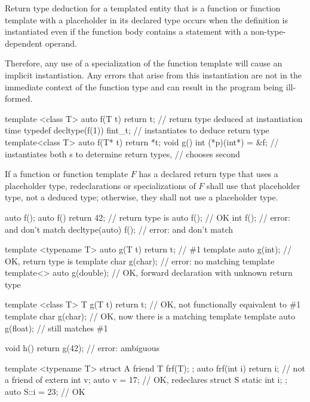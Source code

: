 \pnum
Return type deduction for a templated entity
that is a function or function template with a placeholder in its
declared type occurs when the definition is instantiated even if the function
body contains a  statement with a non-type-dependent operand.
\begin{note}
Therefore, any use of a specialization of the function template will
cause an implicit instantiation. Any errors that arise from this instantiation
are not in the immediate context of the function type and can result in the
program being ill-formed.
\end{note}
\begin{example}
\begin{codeblock}
template <class T> auto f(T t) { return t; }    // return type deduced at instantiation time
typedef decltype(f(1)) fint_t;                  // instantiates  to deduce return type
template<class T> auto f(T* t) { return *t; }
void g() { int (*p)(int*) = &f; }               // instantiates both s to determine return types,
                                                // chooses second
\end{codeblock}
\end{example}

\pnum
If a function or function template $F$ has
a declared return type that uses a placeholder type,
redeclarations or specializations of $F$ shall use that
placeholder type, not a deduced type;
otherwise, they shall not use a placeholder type.
\begin{example}
\begin{codeblock}
auto f();
auto f() { return 42; }                         // return type is 
auto f();                                       // OK
int f();                                        // error:  and  don't match
decltype(auto) f();                             // error:  and  don't match

template <typename T> auto g(T t) { return t; } // \#1
template auto g(int);                           // OK, return type is 
template char g(char);                          // error: no matching template
template<> auto g(double);                      // OK, forward declaration with unknown return type

template <class T> T g(T t) { return t; }       // OK, not functionally equivalent to \#1
template char g(char);                          // OK, now there is a matching template
template auto g(float);                         // still matches \#1

void h() { return g(42); }                      // error: ambiguous

template <typename T> struct A {
  friend T frf(T);
};
auto frf(int i) { return i; }                   // not a friend of 
extern int v;
auto v = 17;                                    // OK, redeclares 
struct S {
  static int i;
};
auto S::i = 23;                                 // OK
\end{codeblock}
\end{example}


